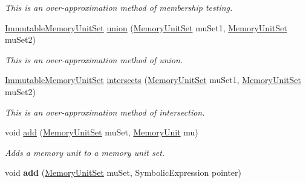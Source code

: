 \begin{DoxyCompactItemize}
\begin{DoxyCompactList}\small\item\em This is an over-\/approximation method of membership testing. \end{DoxyCompactList}\item 
\hyperlink{classedu_1_1udel_1_1cis_1_1vsl_1_1civl_1_1state_1_1common_1_1immutable_1_1ImmutableMemoryUnitSet}{Immutable\+Memory\+Unit\+Set} \hyperlink{classedu_1_1udel_1_1cis_1_1vsl_1_1civl_1_1state_1_1common_1_1immutable_1_1ImmutableMemoryUnitFactory_af6097f29066b0c80acc325011594756f}{union} (\hyperlink{interfaceedu_1_1udel_1_1cis_1_1vsl_1_1civl_1_1state_1_1IF_1_1MemoryUnitSet}{Memory\+Unit\+Set} mu\+Set1, \hyperlink{interfaceedu_1_1udel_1_1cis_1_1vsl_1_1civl_1_1state_1_1IF_1_1MemoryUnitSet}{Memory\+Unit\+Set} mu\+Set2)
\begin{DoxyCompactList}\small\item\em This is an over-\/approximation method of union. \end{DoxyCompactList}\item 
\hyperlink{classedu_1_1udel_1_1cis_1_1vsl_1_1civl_1_1state_1_1common_1_1immutable_1_1ImmutableMemoryUnitSet}{Immutable\+Memory\+Unit\+Set} \hyperlink{classedu_1_1udel_1_1cis_1_1vsl_1_1civl_1_1state_1_1common_1_1immutable_1_1ImmutableMemoryUnitFactory_a322588182c0edbbd76d8f86aa2cf9fd2}{intersects} (\hyperlink{interfaceedu_1_1udel_1_1cis_1_1vsl_1_1civl_1_1state_1_1IF_1_1MemoryUnitSet}{Memory\+Unit\+Set} mu\+Set1, \hyperlink{interfaceedu_1_1udel_1_1cis_1_1vsl_1_1civl_1_1state_1_1IF_1_1MemoryUnitSet}{Memory\+Unit\+Set} mu\+Set2)
\begin{DoxyCompactList}\small\item\em This is an over-\/approximation method of intersection. \end{DoxyCompactList}\item 
void \hyperlink{classedu_1_1udel_1_1cis_1_1vsl_1_1civl_1_1state_1_1common_1_1immutable_1_1ImmutableMemoryUnitFactory_a410154869f968ce72dca60cefb4d6a34}{add} (\hyperlink{interfaceedu_1_1udel_1_1cis_1_1vsl_1_1civl_1_1state_1_1IF_1_1MemoryUnitSet}{Memory\+Unit\+Set} mu\+Set, \hyperlink{interfaceedu_1_1udel_1_1cis_1_1vsl_1_1civl_1_1state_1_1IF_1_1MemoryUnit}{Memory\+Unit} mu)
\begin{DoxyCompactList}\small\item\em Adds a memory unit to a memory unit set. \end{DoxyCompactList}\item 
\hypertarget{classedu_1_1udel_1_1cis_1_1vsl_1_1civl_1_1state_1_1common_1_1immutable_1_1ImmutableMemoryUnitFactory_ac508a007149ebc7ddb49070882affc2f}{}void {\bfseries add} (\hyperlink{interfaceedu_1_1udel_1_1cis_1_1vsl_1_1civl_1_1state_1_1IF_1_1MemoryUnitSet}{Memory\+Unit\+Set} mu\+Set, Symbolic\+Expression pointer)\label{classedu_1_1udel_1_1cis_1_1vsl_1_1civl_1_1state_1_1common_1_1immutable_1_1ImmutableMemoryUnitFactory_ac508a007149ebc7ddb49070882affc2f}


\end{DoxyCompactItemize}
